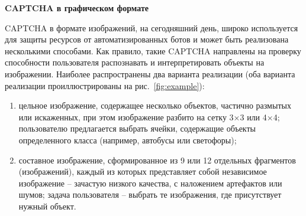 \textbf{CAPTCHA в графическом формате}

CAPTCHA в формате изображений, на сегодняшний день, широко используется для 
защиты ресурсов от автоматизированных ботов и может быть реализована несколькими 
способами. Как правило, такие CAPTCHA направлены на проверку способности 
пользователя распознавать и интерпретировать объекты на изображении. Наиболее 
распространены два варианта реализации (оба варианта реализации проиллюстрированы 
на рис.~\ref{fig:example}):

\begin{enumerate}
    \item цельное изображение, содержащее несколько объектов, частично размытых 
    или искаженных, при этом изображение разбито на сетку 3×3 или 4×4; 
    пользователю предлагается выбрать ячейки, содержащие объекты определенного 
    класса (например, автобусы или светофоры);
    \item составное изображение, сформированное из 9 или 12 отдельных фрагментов 
    (изображений), каждый из которых представляет собой независимое изображение 
    -- зачастую низкого качества, с наложением артефактов или шумов; задача 
    пользователя -- выбрать те изображения, где присутствует нужный объект.
\end{enumerate}

